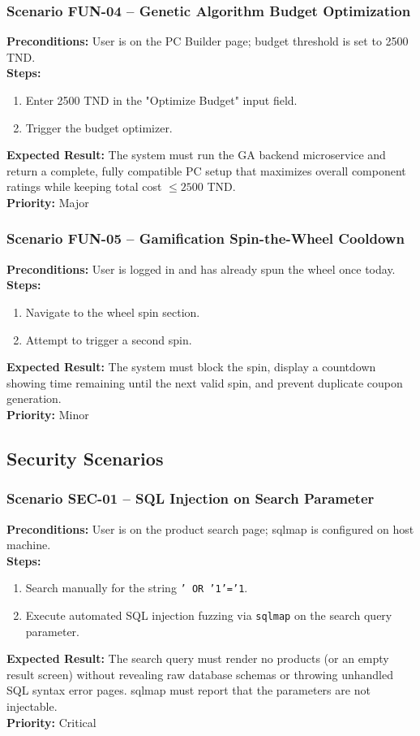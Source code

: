 \documentclass[12pt,a4paper]{article}
\begin{document}
\subsubsection*{Scenario FUN-04 – Genetic Algorithm Budget Optimization}
\textbf{Preconditions:} User is on the PC Builder page; budget threshold is set to 2500 TND.\\
\textbf{Steps:}
\begin{enumerate}
\item Enter 2500 TND in the "Optimize Budget" input field.
\item Trigger the budget optimizer.
\end{enumerate}
\textbf{Expected Result:} The system must run the GA backend microservice and return a complete, fully compatible PC setup that maximizes overall component ratings while keeping total cost $\le 2500$ TND.\\
\textbf{Priority:} Major

\subsubsection*{Scenario FUN-05 – Gamification Spin-the-Wheel Cooldown}
\textbf{Preconditions:} User is logged in and has already spun the wheel once today.\\
\textbf{Steps:}
\begin{enumerate}
\item Navigate to the wheel spin section.
\item Attempt to trigger a second spin.
\end{enumerate}
\textbf{Expected Result:} The system must block the spin, display a countdown showing time remaining until the next valid spin, and prevent duplicate coupon generation.\\
\textbf{Priority:} Minor

\subsection{Security Scenarios}

\subsubsection*{Scenario SEC-01 – SQL Injection on Search Parameter}
\textbf{Preconditions:} User is on the product search page; sqlmap is configured on host machine.\\
\textbf{Steps:}
\begin{enumerate}
\item Search manually for the string \texttt{' OR '1'='1}.
\item Execute automated SQL injection fuzzing via \texttt{sqlmap} on the search query parameter.
\end{enumerate}
\textbf{Expected Result:} The search query must render no products (or an empty result screen) without revealing raw database schemas or throwing unhandled SQL syntax error pages. sqlmap must report that the parameters are not injectable.\\
\textbf{Priority:} Critical
\end{document}
